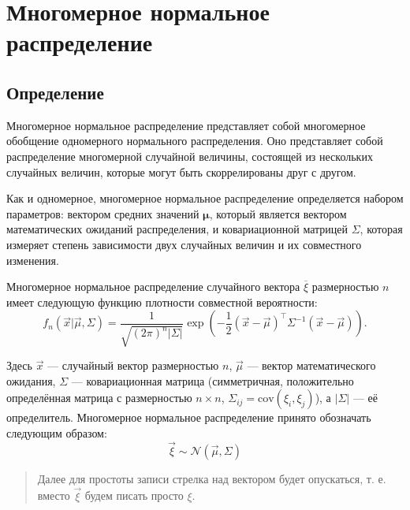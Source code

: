\documentclass[11pt,a4paper]{article}
\begin{document}
    \hypertarget{ux43cux43dux43eux433ux43eux43cux435ux440ux43dux43eux435-ux43dux43eux440ux43cux430ux43bux44cux43dux43eux435-ux440ux430ux441ux43fux440ux435ux434ux435ux43bux435ux43dux438ux435}{%
\section{Многомерное нормальное
распределение}\label{ux43cux43dux43eux433ux43eux43cux435ux440ux43dux43eux435-ux43dux43eux440ux43cux430ux43bux44cux43dux43eux435-ux440ux430ux441ux43fux440ux435ux434ux435ux43bux435ux43dux438ux435}}

    \hypertarget{ux43eux43fux440ux435ux434ux435ux43bux435ux43dux438ux435}{%
\subsection{Определение}\label{ux43eux43fux440ux435ux434ux435ux43bux435ux43dux438ux435}}

Многомерное нормальное распределение представляет собой многомерное
обобщение одномерного нормального распределения. Оно представляет собой
распределение многомерной случайной величины, состоящей из нескольких
случайных величин, которые могут быть скоррелированы друг с другом.

Как и одномерное, многомерное нормальное распределение определяется
набором параметров: вектором средних значений \(\mathbf{\mu}\), который
является вектором математических ожиданий распределения, и
ковариационной матрицей \(\Sigma\), которая измеряет степень зависимости
двух случайных величин и их совместного изменения.

Многомерное нормальное распределение случайного вектора
\(\overline{\xi}\) размерностью \(n\) имеет следующую функцию плотности
совместной вероятности:
\[
f_n(\vec{x}|\vec{\mu}, \Sigma) = \frac{1}{\sqrt{(2\pi)^n |\Sigma|}} \exp{ \left( -\frac{1}{2}(\vec{x} - \vec{\mu})^\top \Sigma^{-1} (\vec{x} - \vec{\mu}) \right)}.
\]

Здесь \(\vec{x}\) --- случайный вектор размерностью \(n\), \(\vec{\mu}\)
--- вектор математического ожидания, \(\Sigma\) --- ковариационная
матрица (симметричная, положительно определённая матрица с размерностью
\(n \times n\), \(\Sigma_{ij} = \text{cov}(\xi_i, \xi_j)\)), а
\(\lvert\Sigma\rvert\) --- её определитель. Многомерное нормальное
распределение принято обозначать следующим образом:
\[
    \vec{\xi} \sim \mathcal{N}(\vec{\mu}, \Sigma)
\]

\begin{quote}
Далее для простоты записи стрелка над вектором будет опускаться, т. е.
вместо \(\vec{\xi}\) будем писать просто \(\xi\).
\end{quote}
\end{document}
